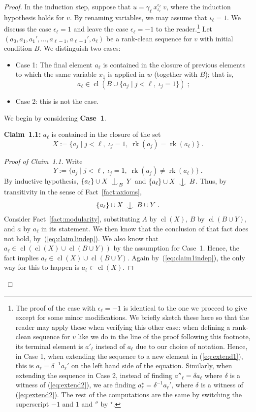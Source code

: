 \documentclass{article}
\theoremstyle{remark}
\theoremstyle{definition}
\newcommand{\remmic}[1]{\textcolor{orange}{MP: #1}}
\DeclareMathOperator{\rk}{rk}
\DeclareMathOperator{\cl}{cl}
\def\Ind#1#2{#1\setbox0=\hbox{$#1x$}\kern\wd0\hbox to 0pt{\hss$#1\mid$\hss}
	\lower.9\ht0\hbox to 0pt{\hss$#1\smile$\hss}\kern\wd0}
\def\ind{\mathop{\mathpalette\Ind{}}}
\newenvironment{subproof}[1][\proofname]{%
  \renewcommand{\qedsymbol}{$\blacksquare$}%
  \begin{proof}[#1]%
}{%
  \end{proof}%
}
\begin{document}
{\begin{proof}
    In the induction step, suppose that  $u=\gamma_\ell\  x_{\iota_\ell}^{\epsilon_\ell}\ v$, where the induction hypothesis holds for $v$. By renaming variables, we may assume that  $\iota_\ell=1$. 
     We discuss the case $\epsilon_\ell=1$ and leave  the case $\epsilon_\ell=-1$ to the reader.\footnote{The proof of the case with $\epsilon_\ell=-1$ is identical to the one we proceed to give except for some minor modifications. We briefly sketch these here so that the reader may apply these when verifying this other case: when defining a rank-clean sequence for $v$ like we do in the line of the proof following this footnote, its terminal element is $a'_\ell$ instead of $a_\ell$ due to our choice of notation. Hence, in Case 1, when extending the sequence to a new element in (\ref{eq:extend1}), this is $a_\ell=\delta^{-1} a_\ell'$ on the left hand side of the equation. Similarly, when extending the sequence in Case 2, instead of finding $a''_\ell=\delta a_\ell$ where $\delta$ is a witness of (\ref{eq:extend2}), we are finding $a^\star_\ell=\delta^{-1}a_\ell'$, where $\delta$ is a witness of (\ref{eq:extend2}). The rest of the computations are the same by switching the superscript $-1$ and $1$ and $''$ by $^\star$.} Let $(a_0,a_1,a_1', \dots,a_{\ell-1}, a_{\ell-1}', a_\ell)$ be a  rank-clean sequence for $v$ with initial condition $B$. We distinguish two cases:
    \begin{itemize}
    \item Case 1: The final element $a_\ell$ is contained in the %
    {closure} of previous elements to which the same variable $x_1$ is applied in $w$ (together with $B$); that is,  
    \[a_\ell\in {\cl}\left(B\cup \{a_j\;|\; j<\ell,\; \iota_j=1\}\right)\; ; \]
    \item Case 2: this is not the case.
\end{itemize}

We begin by considering \textbf{Case~1}.

\textbf{Claim~1.1:} $a_\ell$ is contained in the 
{closure} of the set 
$$X:=\{a_j\;|\; j<\ell,\; \iota_j=1,\; \rk(a_j)=\rk(a_\ell)\}\; .$$ 
\begin{subproof}[Proof of Claim~1.1] Write  $$Y:=\{a_j\;|\; j<\ell,\; \iota_j=1,\; \rk(a_j)\neq \rk(a_\ell)\}\; .$$ 
By inductive hypothesis, $\{a_\ell\}\cup X\;\ind_B\; Y$ and $\{a_\ell\}\cup X\;\ind\; B$. Thus, by transitivity in the sense of Fact~\ref{fact:axioms}, 
\begin{equation}\label{eq:claim1indep}
  \{a_\ell\}\cup X\; \ind\; B\cup Y \;. 
\end{equation} %
Consider  Fact~\ref{fact:modularity}, substituting $A$ by ${\cl}(X)$, $B$ by ${\cl}(B\cup Y)$, and $a$ by $a_\ell$ in its statement. We then know that the conclusion of that  fact does not hold, by~(\ref{eq:claim1indep}). We also know that $a_\ell\in {\cl}({\cl}(X)\cup {\cl}(B\cup Y))$ by the assumption for Case~1. Hence, the fact implies $a_\ell\in {\cl}(X)\cup {\cl}(B\cup Y)$. Again by~(\ref{eq:claim1indep}), the only way for this to happen is $a_\ell\in {\cl}(X)$.



\end{subproof}
\end{proof}}
\end{document}
